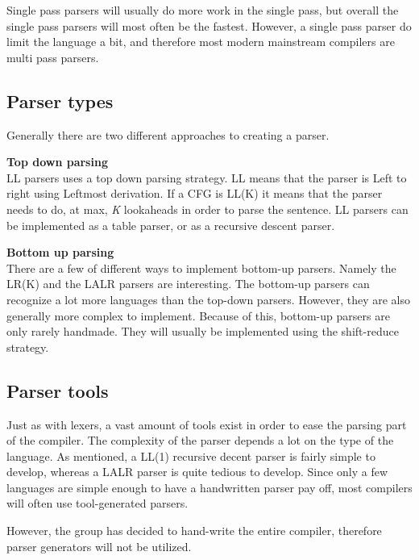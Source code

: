 Single pass parsers will usually do more work in the single pass, but overall the single pass parsers will most often be the fastest.
However, a single pass parser do limit the language a bit, and therefore most modern mainstream compilers are multi pass parsers.

\subsection{Parser types}
Generally there are two different approaches to creating a parser.

\textbf{Top down parsing}\\
LL parsers uses a top down parsing strategy. 
LL means that the parser is Left to right using Leftmost derivation. 
If a CFG is LL(K) it means that the parser needs to do, at max, \textit{K} lookaheads in order to parse the sentence. 
LL parsers can be implemented as a table parser, or as a recursive descent parser. 

\textbf{Bottom up parsing}\\
There are a few of different ways to implement bottom-up parsers. 
Namely the LR(K) and the LALR parsers are interesting. 
The bottom-up parsers can recognize a lot more languages than the top-down parsers.
However, they are also generally more complex to implement.
Because of this, bottom-up parsers are only rarely handmade.
They will usually be implemented using the shift-reduce strategy.

\subsection{Parser tools}
Just as with lexers, a vast amount of tools exist in order to ease the parsing part of the compiler. 
The complexity of the parser depends a lot on the type of the language. 
As mentioned, a LL(1) recursive decent parser is fairly simple to develop, whereas a LALR parser is quite tedious to develop. 
Since only a few languages are simple enough to have a handwritten parser pay off, most compilers will often use tool-generated parsers.

However, the group has decided to hand-write the entire compiler, therefore parser generators will not be utilized.
